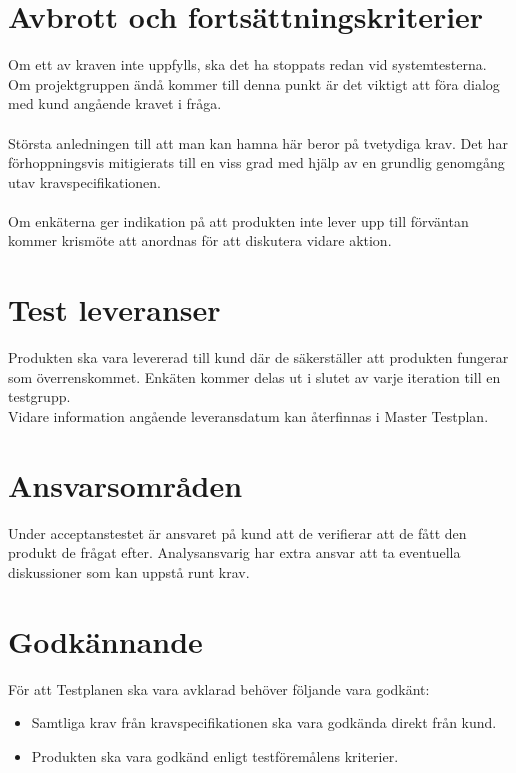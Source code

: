 \section{Avbrott och fortsättningskriterier}
	Om ett av kraven inte uppfylls, ska det ha stoppats redan vid systemtesterna. Om projektgruppen ändå kommer till denna punkt är det viktigt att föra dialog med kund angående kravet i fråga.\\
	\\
	Största anledningen till att man kan hamna här beror på tvetydiga krav. Det har förhoppningsvis mitigierats till en viss grad med hjälp av en grundlig genomgång utav kravspecifikationen.
\\ \\
	Om enkäterna ger indikation på att produkten inte lever upp till förväntan kommer krismöte att anordnas för att diskutera vidare aktion.


\section{Test leveranser }
	Produkten ska vara levererad till kund där de säkerställer att produkten fungerar som överrenskommet. Enkäten kommer delas ut i slutet av varje iteration till en testgrupp.
\\	
	Vidare information angående leveransdatum kan återfinnas i Master Testplan.
	

	
\section{Ansvarsområden}
	Under acceptanstestet är ansvaret på kund att de verifierar att de fått den produkt de frågat efter. Analysansvarig har extra ansvar att ta eventuella diskussioner som kan uppstå runt krav.
	

	

	
	
\section{Godkännande}
	För att Testplanen ska vara avklarad behöver följande vara godkänt:
	\begin{itemize}
	 \item Samtliga krav från kravspecifikationen ska vara godkända direkt från kund.
	\item Produkten ska vara godkänd enligt testföremålens kriterier.
	\end{itemize}
	


\printbibliography





